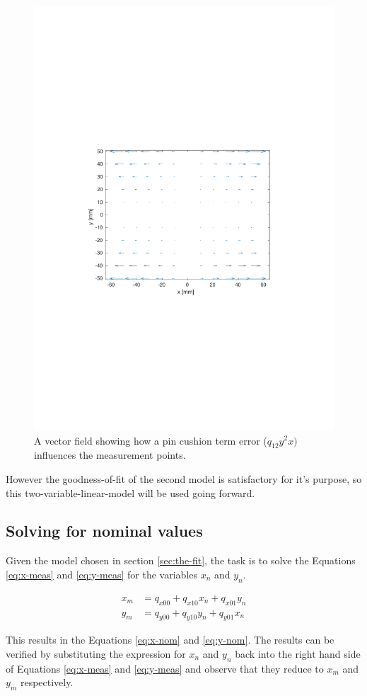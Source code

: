 \begin{figure}
  \centering
  \includegraphics[clip, trim=3.5cm 8cm 3.5cm 8cm, width=0.72\linewidth]{Pictures/pincushion.pdf}
  \caption{A vector field showing how a pin cushion term error ($q_{12}y^2x)$ influences the measurement points.}
  \label{fig:pincushion}
\end{figure}

However the goodness-of-fit of the second model is satisfactory for it's purpose, so this two-variable-linear-model will be used going forward.

\subsection{Solving for nominal values}

Given the model chosen in section \ref{sec:the-fit}, the task is to solve the Equations \ref{eq:x-meas} and \ref{eq:y-meas} for the variables $x_n$ and $y_n$.

\begin{align}
x_m &= q_{x00} + q_{x10}x_n + q_{x01}y_n \label{eq:x-meas}\\
y_m &= q_{y00} + q_{y10}y_n + q_{y01}x_n \label{eq:y-meas}
\end{align}

This results in the Equations \ref{eq:x-nom} and \ref{eq:y-nom}. The results can be verified by substituting the expression for $x_n$ and $y_n$ back into the right hand side of Equations \ref{eq:x-meas} and \ref{eq:y-meas} and observe that they reduce to  $x_m$ and $y_m$ respectively.

